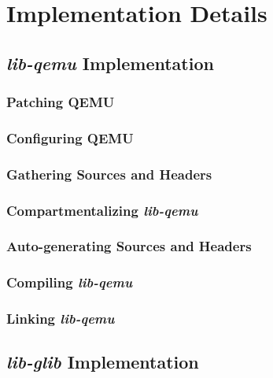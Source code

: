 \chapter{Implementation Details}
\label{chapter:implementation-details}

\section{\textit{lib-qemu} Implementation}
\label{sec:lib-qemu-impl}

\subsection{Patching QEMU}
\label{subsec:patching-qemu}

\subsection{Configuring QEMU}
\label{subsec:configuring-qemu}

\subsection{Gathering Sources and Headers}
\label{subsec:gathering-sources-headers}

\subsection{Compartmentalizing \textit{lib-qemu}}
\label{subsec:compartmentalizing-qemu}

\subsection{Auto-generating Sources and Headers}
\label{subsec:autogenerating-sources-headers}

\subsection{Compiling \textit{lib-qemu}}
\label{subsec:compiling-qemu}

\subsection{Linking \textit{lib-qemu}}
\label{subsec:linking-qemu}

\section{\textit{lib-glib} Implementation}
\label{sec:lib-glib-impl}

